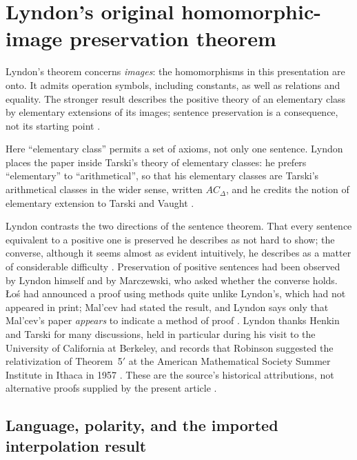 \section{Lyndon's original homomorphic-image preservation theorem}
\label{sec:p03-n-a-011-02}

Lyndon's theorem concerns \emph{images}: the homomorphisms in this
presentation are onto. It admits operation symbols, including constants,
as well as relations and equality. The stronger result describes the
positive theory of an elementary class by elementary extensions of its
images; sentence preservation is a consequence, not its starting point
\cite[pp.~143--154]{Lyndon1959}.

Here ``elementary class'' permits a set of axioms, not only one sentence.
Lyndon places the paper inside Tarski's theory of elementary classes: he
prefers ``elementary'' to ``arithmetical'', so that his elementary classes
are Tarski's arithmetical classes in the wider sense, written
\(AC_{\Delta}\), and he credits the notion of elementary extension to
Tarski and Vaught \cite[p.~144 and n.~1]{Lyndon1959}.

Lyndon contrasts the two directions of the sentence theorem. That every
sentence equivalent to a positive one is preserved he describes as not
hard to show; the converse, although it seems almost as evident
intuitively, he describes as a matter of considerable difficulty
\cite[p.~143]{Lyndon1959}. Preservation of positive sentences had been
observed by Lyndon himself and by Marczewski, who asked whether the
converse holds. \L o\'s had announced a proof using methods quite unlike
Lyndon's, which had not appeared in print; Mal'cev had stated the result,
and Lyndon says only that Mal'cev's paper \emph{appears} to indicate a
method of proof \cite[p.~143]{Lyndon1959}. Lyndon thanks Henkin and Tarski
for many discussions, held in particular during his visit to the University
of California at Berkeley, and records that Robinson suggested the
relativization of Theorem~5\('\) at the American Mathematical Society
Summer Institute in Ithaca in 1957 \cite[p.~144 and nn.~2--3]{Lyndon1959}.
These are the source's historical attributions, not alternative proofs
supplied by the present article \cite[pp.~143--144,151]{Lyndon1959}.

\subsection{Language, polarity, and the imported interpolation result}


